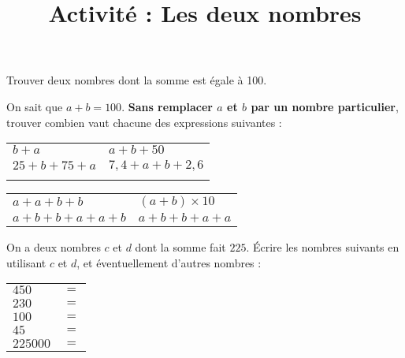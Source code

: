 \documentclass[12pt]{beamer}
\title{Activité : Les deux nombres}
\author{}
\date{}
\begin{document}
\begin{frame}
	\maketitle
\end{frame}

\begin{frame}
	Trouver deux nombres dont la somme est égale à 100.
\end{frame}

\begin{frame}
	On sait que $a + b = 100$. \textbf{Sans remplacer $a$ et $b$ par un nombre particulier}, trouver combien vaut chacune des expressions suivantes :

	\renewcommand{\tabcolsep}{1.2em}
	\begin{tabular}{ll}
		$b + a$                           & $a + b + 50$        \\
		$25 + b + 75 + a$                 & $7{,}4 + a + b + 2{,}6$ \\
		\phantom{$a + b + b + a + a + b$} &
	\end{tabular}
	\pause
	\begin{tabular}{ll}
		$a + a + b + b$         & $(a + b) × 10$      \\
		$a + b + b + a + a + b$ & $a + b + b + a + a$
	\end{tabular}
\end{frame}

\begin{frame}
	On a deux nombres $c$ et $d$ dont la somme fait $225$. Écrire les nombres suivants en utilisant $c$ et $d$, et éventuellement d'autres nombres : \vspace{1em}

	\renewcommand{\arraystretch}{1.5}
	\begin{tabular}{ll}
		$450$    & $=$ \\
		$230$    & $=$ \\
		$100$    & $=$ \\
		$45$     & $=$ \\
		$225000$ & $=$
	\end{tabular}
\end{frame}
\end{document}
